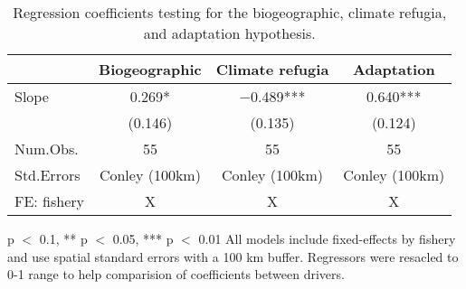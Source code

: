 \begin{table}

\caption{\label{tab:biophysical_vs_effect}Regression coefficients testing for the biogeographic, climate refugia, and adaptation hypothesis.}
\centering
\begin{threeparttable}
\begin{tabular}[t]{lccc}
\toprule
  & Biogeographic & Climate refugia & Adaptation\\
\midrule
Slope & \num{0.269}* & \num{-0.489}*** & \num{0.640}***\\
 & (\num{0.146}) & (\num{0.135}) & (\num{0.124})\\
\midrule
Num.Obs. & \num{55} & \num{55} & \num{55}\\
Std.Errors & Conley (100km) & Conley (100km) & Conley (100km)\\
FE: fishery & X & X & X\\
\bottomrule
\end{tabular}
\begin{tablenotes}
\item * p $<$ 0.1, ** p $<$ 0.05, *** p $<$ 0.01 All models include fixed-effects by fishery and use spatial standard errors with a 100 km buffer. Regressors were resacled to 0-1 range to help comparision of coefficients between drivers.
\end{tablenotes}
\end{threeparttable}
\end{table}
